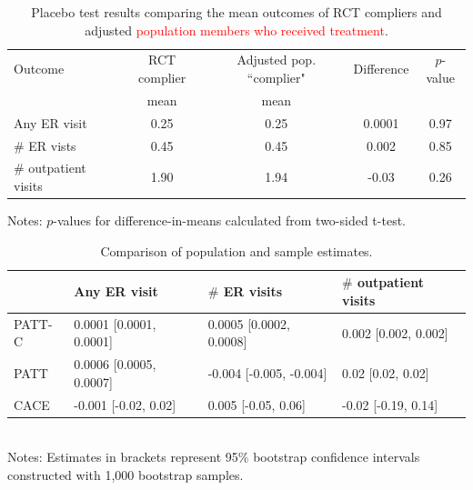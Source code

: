\documentclass[hidelinks,12pt]{article}
\begin{document}
\begin{appendices}
\begin{table}[h]
	\begin{center}
		\caption{Placebo test results comparing the mean outcomes of RCT compliers and adjusted \textcolor{red}{population members who received treatment}.\label{placebo}} 
	\begin{tabular}{@{}lcccc@{}}
		\toprule
		Outcome                & RCT complier & Adjusted pop. ``complier" & Difference & $p$-value \\
				                &  mean & mean & &  \\		
		 \midrule
		Any ER visit           & 0.25              & 0.25                           & 0.0001     & 0.97    \\
		$\#$ ER vists          & 0.45              & 0.45                           & 0.002      & 0.85    \\
		$\#$ outpatient visits & 1.90              & 1.94                           & -0.03      & 0.26    \\ \bottomrule
	\end{tabular}
\end{center}
\footnotesize{Notes: $p$-values for difference-in-means calculated from two-sided t-test.}
\end{table}

\begin{table}[h]
	\caption{Comparison of population and sample estimates.\label{compliance-compare}} 
	\begin{tabular}{@{}llll@{}}
		\toprule
		\backslashbox{Estimator}{Outcome} 				& Any ER visit 	& $\#$ ER visits   & $\#$ outpatient visits      \\ \midrule
		PATT-C                                           & 0.0001 [0.0001, 0.0001]   & 0.0005 [0.0002, 0.0008]	& 0.002 [0.002, 0.002] \\
		PATT                                             & 0.0006 [0.0005, 0.0007]   & -0.004 [-0.005, -0.004]	& 0.02 [0.02, 0.02]  \\
		CACE                                             & -0.001 [-0.02, 0.02]   & 0.005 [-0.05, 0.06]	& -0.02 [-0.19, 0.14]  \\ \bottomrule
	\end{tabular}\\
	\footnotesize{Notes: Estimates in brackets represent 95\% bootstrap confidence intervals constructed with 1,000 bootstrap samples.}
\end{table}


\end{appendices}
\end{document}

